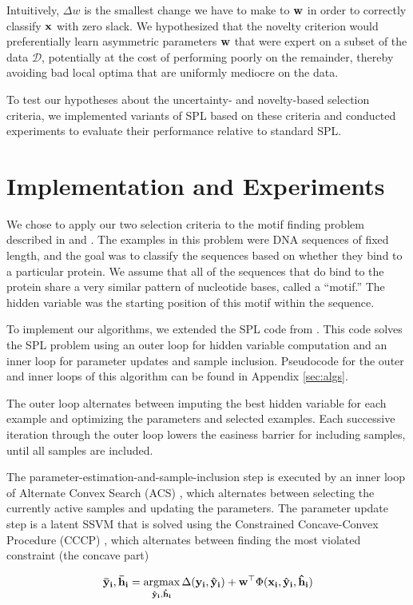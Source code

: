\documentclass{article}
\newcommand{\mysection}[1]{\vspace{-4mm}\section{#1}\vspace{-4mm}}
\newcommand{\argmax}{\operatornamewithlimits{argmax}}
\begin{document}
Intuitively, $\Delta w$ is the smallest change we have to make to $\bf w$ in order to correctly classify $\bf x$ with zero slack.  We hypothesized that the novelty criterion would preferentially learn asymmetric parameters $\bf w$ that were expert on a subset of the data $\mathcal{D}$, potentially at the cost of performing poorly on the remainder, thereby avoiding bad local optima that are uniformly mediocre on the data.

To test our hypotheses about the uncertainty- and novelty-based selection criteria, we implemented variants of SPL based on these criteria and conducted experiments to evaluate their performance relative to standard SPL.

\mysection{Implementation and Experiments}
\label{sec:implementation}

We chose to apply our two selection criteria to the motif finding problem described in \cite{SPL} and \cite{SSVM}. The examples in this problem were DNA sequences of fixed length, and the goal was to classify the sequences based on whether they bind to a particular protein. We assume that all of the sequences that do bind to the protein share a very similar pattern of nucleotide bases, called a ``motif.'' The hidden variable was the starting position of this motif within the sequence.

To implement our algorithms, we extended the SPL code from \cite{SPL}. This code solves the SPL problem using an outer loop for hidden variable computation and an inner loop for parameter updates and sample inclusion. Pseudocode for the outer and inner loops of this algorithm can be found in Appendix \ref{sec:algs}.

The outer loop alternates between imputing the best hidden variable for each example and optimizing the parameters and selected examples.  Each successive iteration through the outer loop lowers the easiness barrier for including samples, until all samples are included.

The parameter-estimation-and-sample-inclusion step is executed by an inner loop of Alternate Convex Search ({\sc ACS}) \cite{SPL}, which alternates between selecting the currently active samples and updating the parameters.  The parameter update step is a latent SSVM that is solved using the Constrained Concave-Convex Procedure ({\sc CCCP}) \cite{SSVM}, which alternates between finding the most violated constraint (the concave part)

\begin{equation}
{\bf\bar y_i,\bf\bar h_i} = \argmax_{{\bf\hat y_i},{\bf\hat h_i}} \Delta({\bf y_i,\bf\hat y_i})+{\bf w}^\top\Phi(\bf x_i,\bf\hat y_i,\bf\hat h_i)
\label{eq:mostviolated}
\end{equation}
\end{document}
